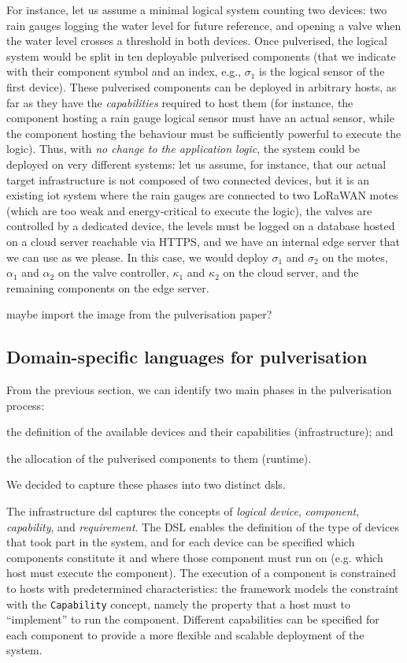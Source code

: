 \documentclass[conference]{IEEEtran}
\newcommand{\meta}[1]{{\color{blue}#1}}
\begin{document}
For instance, let us assume a minimal logical system counting two devices:
two rain gauges logging the water level for future reference,
and opening a valve when the water level crosses a threshold in both devices.
%
Once pulverised, the logical system would be split in ten deployable pulverised components
(that we indicate with their component symbol and an index, e.g., $\sigma_1$ is the logical sensor of the first device).
%
These pulverised components can be deployed in arbitrary hosts,
as far as they have the \emph{capabilities} required to host them
(for instance, the component hosting a rain gauge logical sensor must have an actual sensor,
while the component hosting the behaviour must be sufficiently powerful to execute the logic).
%
Thus, with \emph{no change to the application logic},
the system could be deployed on very different systems:
let us assume, for instance,
that our actual target infrastructure is not composed of two connected devices,
but it is an existing \ac{iot} system
where the rain gauges are connected to two LoRaWAN motes
(which are too weak and energy-critical to execute the logic),
the valves are controlled by a dedicated device,
the levels must be logged on a database hosted on a cloud server reachable via HTTPS,
and we have an internal edge server that we can use as we please.
%
In this case, we would deploy $\sigma_1$ and $\sigma_2$ on the motes,
$\alpha_1$ and $\alpha_2$ on the valve controller,
$\kappa_1$ and $\kappa_2$ on the cloud server,
and the remaining components on the edge server.

\meta{maybe import the image from the pulverisation paper?}

\subsection{Domain-specific languages for pulverisation}

From the previous section,
we can identify two main phases in the pulverisation process:
\begin{enumerate*}[label=\it{(\roman*)}]
  \item the definition of the available devices and their capabilities (infrastructure); and
  \item the allocation of the pulverised components to them (runtime).
\end{enumerate*}
%
We decided to capture these phases into two distinct \acp{dsl}.

The infrastructure \ac{dsl} captures the concepts of
\emph{logical device}, \emph{component}, \emph{capability}, and \emph{requirement}.
%
The DSL enables the definition of the type of devices that took part in the system,
and for each device can be specified which components constitute it and where those component must run on (e.g. which host must execute the component).
%
The execution of a component is constrained to hosts with predetermined characteristics:
the framework models the constraint with the \texttt{Capability} concept,
namely the property that a host must to ``implement'' to run the component.
%
Different capabilities can be specified for each component to provide a more flexible and scalable deployment of the system.
\end{document}
